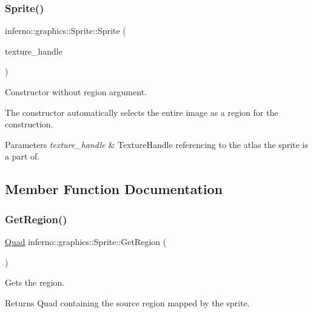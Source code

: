 \subsubsection{\texorpdfstring{Sprite()}{Sprite()}\hspace{0.1cm}{\footnotesize\ttfamily [2/2]}}
{\footnotesize\ttfamily inferno\+::graphics\+::\+Sprite\+::\+Sprite (\begin{DoxyParamCaption}\item[{Texture\+Handle}]{texture\+\_\+handle }\end{DoxyParamCaption})\hspace{0.3cm}{\ttfamily [inline]}}



Constructor without region argument. 

The constructor automatically selects the entire image as a region for the construction. 
\begin{DoxyParams}{Parameters}
{\em texture\+\_\+handle} & Texture\+Handle referencing to the atlas the sprite is a part of. \\
\hline
\end{DoxyParams}


\subsection{Member Function Documentation}
\mbox{\label{classinferno_1_1graphics_1_1_sprite_ad2f468c9390d0d952f049daba69ef53f}} 
\subsubsection{\texorpdfstring{Get\+Region()}{GetRegion()}}
{\footnotesize\ttfamily \mbox{\hyperlink{classinferno_1_1graphics_1_1_rectangle}{Quad}} inferno\+::graphics\+::\+Sprite\+::\+Get\+Region (\begin{DoxyParamCaption}{ }\end{DoxyParamCaption})\hspace{0.3cm}{\ttfamily [inline]}}



Gets the region. 

\begin{DoxyReturn}{Returns}
Quad containing the source region mapped by the sprite. 
\end{DoxyReturn}
\mbox{\label{classinferno_1_1graphics_1_1_sprite_a289d0e72752f3606116c75442a710e61}} 
